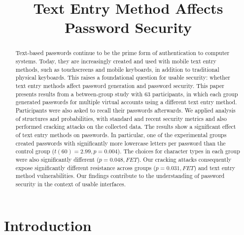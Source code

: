 \documentclass[conference]{IEEEtran}
\begin{document}
\title{Text Entry Method Affects Password Security}
\author{
\and
{}
\and
{}
}










\maketitle


\begin{abstract}
Text-based passwords continue to be the prime form of authentication to computer systems. Today, they are increasingly created and used with mobile text entry methods, such as touchscreens and mobile keyboards, in addition to traditional physical keyboards.
This raises a foundational question for usable security: whether text entry methods affect password generation and password security. 
This paper presents results from a between-group study with 63 participants, in which each group generated passwords for multiple virtual accounts using a different text entry method. Participants were also asked to recall their passwords afterwards. 
We applied analysis of structures and probabilities, with standard and recent security metrics and also performed cracking attacks on the collected data. 
The results show a significant effect of text entry methods on passwords. 
In particular, one of the experimental groups created passwords with significantly more lowercase letters per password than the control group ($t(60) = 2.99, p = 0.004$). The choices for character types in each group were also significantly different ($p=0.048, FET$).
Our cracking attacks consequently expose significantly different resistance across groups ($p=0.031, FET$) and text entry method vulnerabilities. 
Our findings contribute to the understanding of password security in the context of usable interfaces.
\end{abstract}


\section{Introduction}
\end{document}
